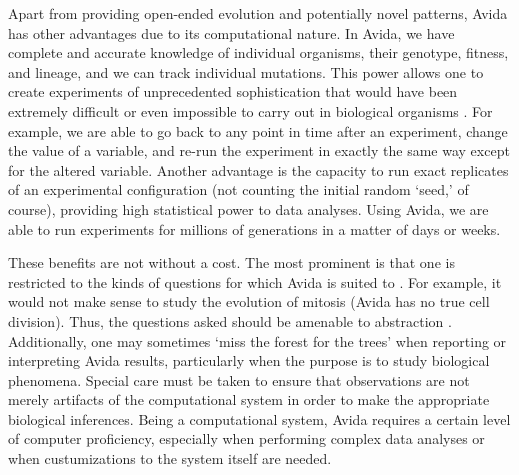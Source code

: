 \begin{doublespace}
Apart from providing open-ended evolution and potentially novel patterns,
Avida has other advantages due to its computational nature.
%
In Avida, we have complete and accurate knowledge of individual organisms,
their genotype, fitness, and lineage, and we can track individual mutations.
%
This power allows one to create experiments of unprecedented sophistication
that would have been extremely difficult or even impossible
to carry out in biological organisms \citep{ele03}.
%
For example, we are able to go back to any point in time after an experiment,
change the value of a variable, and re-run the experiment
in exactly the same way except for the altered variable.
%
Another advantage is the capacity to run exact replicates
of an experimental configuration
(not counting the initial random `seed,' of course),
providing high statistical power to data analyses.
%
Using Avida, we are able to run experiments for millions of generations
in a matter of days or weeks.


These benefits are not without a cost.
%
The most prominent is that one is restricted to the kinds of questions
for which Avida is suited to \citep{wil02}.
%
For example, it would not make sense to study
the evolution of mitosis (Avida has no true cell division).
%
Thus, the questions asked should be amenable to abstraction \citep{wil02}.
%
Additionally, one may sometimes `miss the forest for the trees'
when reporting or interpreting Avida results,
particularly when the purpose is to study biological phenomena.
%
Special care must be taken to ensure that observations
are not merely artifacts of the computational system
in order to make the appropriate biological inferences.
%
Being a computational system, Avida requires a certain level
of computer proficiency, especially when performing complex data analyses
or when custumizations to the system itself are needed.



\end{doublespace}
